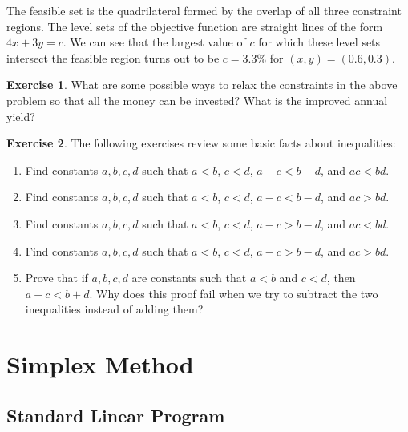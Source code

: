 \documentclass[
]{book}
\providecommand{\tightlist}{%
  \setlength{\itemsep}{0pt}\setlength{\parskip}{0pt}}
\theoremstyle{definition}
\theoremstyle{definition}
\theoremstyle{definition}
\newtheorem{exercise}{Exercise}[chapter]
\theoremstyle{definition}
\theoremstyle{remark}
\begin{document}
The feasible set is the quadrilateral formed by the overlap of all three constraint regions. The level sets of the objective function are straight lines of the form \(4x + 3y = c\). We can see that the largest value of \(c\) for which these level sets intersect the feasible region turns out to be \(c = 3.3\%\) for \((x, y) = (0.6, 0.3)\).

\begin{exercise}
What are some possible ways to relax the constraints in the above problem so that all the money can be invested? What is the improved annual yield?
\end{exercise}

\begin{exercise}

The following exercises review some basic facts about inequalities:

\begin{enumerate}
\def\labelenumi{\arabic{enumi}.}
\tightlist
\item
  Find constants \(a, b, c, d\) such that \(a < b\), \(c < d\), \(a - c < b - d\), and \(ac < bd\).
\item
  Find constants \(a, b, c, d\) such that \(a < b\), \(c < d\), \(a - c < b - d\), and \(ac > bd\).
\item
  Find constants \(a, b, c, d\) such that \(a < b\), \(c < d\), \(a - c > b - d\), and \(ac < bd\).
\item
  Find constants \(a, b, c, d\) such that \(a < b\), \(c < d\), \(a - c > b - d\), and \(ac > bd\).
\item
  Prove that if \(a, b, c, d\) are constants such that \(a < b\) and \(c < d\), then \(a + c < b + d\). Why does this proof fail when we try to subtract the two inequalities instead of adding them?
\end{enumerate}

\end{exercise}

\hypertarget{part-simplex-method}{%
\part{Simplex Method}\label{part-simplex-method}}

\hypertarget{standard-linear-program}{%
\chapter{Standard Linear Program}\label{standard-linear-program}}
\end{document}
